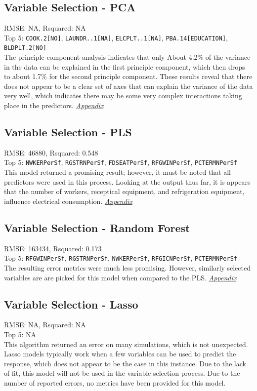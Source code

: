 \subsection{Variable Selection - PCA}
RMSE: NA, Rsquared: NA\\
Top 5: \lstinline{COOK.2[NO]}, \lstinline{LAUNDR..1[NA]}, \lstinline{ELCPLT..1[NA]}, \lstinline{PBA.14[EDUCATION]}, \lstinline{BLDPLT.2[NO]}
\\[0.1in]
\indent The principle component analysis indicates that only About 4.2\% of the variance in the data can be explained in the first principle component, which then drops to about 1.7\% for the second principle component.  These results reveal that there does not appear to be a clear set of axes that can explain the variance of the data very well, which indicates there may be some very complex interactions taking place in the predictors.  \textit{\hyperref[appendix:electricity:pca]{Appendix}}

\subsection{Variable Selection - PLS}
RMSE: 46880, Rsquared: 0.548\\
Top 5: \lstinline{NWKERPerSf}, \lstinline{RGSTRNPerSf}, \lstinline{FDSEATPerSf}, \lstinline{RFGWINPerSf}, \lstinline{PCTERMNPerSf}
\\[0.1in]
\indent This model returned a promising result; however, it must be noted that all predictors were used in this process.  Looking at the output thus far, it is appears that the number of workers, receptical equipment, and refrigeration equipment, influence electrical consumption.  \textit{\hyperref[appendix:electricity:pls]{Appendix}}

\subsection{Variable Selection - Random Forest}
RMSE: 163434, Rsquared: 0.173\\
Top 5: \lstinline{RFGWINPerSf}, \lstinline{RGSTRNPerSf}, \lstinline{NWKERPerSf}, \lstinline{RFGICNPerSf},  \lstinline{PCTERMNPerSf}
\\[0.1in]
\indent The resulting error metrics were much less promising.  However, similarly selected variables are are picked for this model when compared to the PLS.  \textit{\hyperref[appendix:electricity:rf]{Appendix}}

\subsection{Variable Selection - Lasso}
RMSE: NA, Rsquared: NA\\
 Top 5: NA
\\[0.1in]
\indent This algorithm returned an error on many simulations, which is not unexpected.  Lasso models typically work when a few variables can be used to predict the response, which does not appear to be the case in this instance.  Due to the lack of fit, this model will not be used in the variable selection process.  Due to the number of reported errors, no metrics have been provided for this model.

